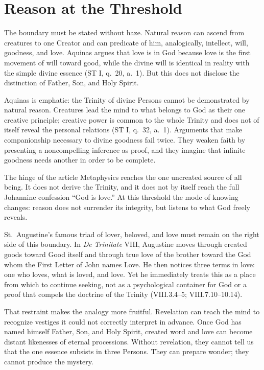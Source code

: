 \section{Reason at the Threshold}

The boundary must be stated without haze. Natural reason can ascend from creatures to one Creator and can predicate of him, analogically, intellect, will, goodness, and love. Aquinas argues that love is in God because love is the first movement of will toward good, while the divine will is identical in reality with the simple divine essence (ST I, q.~20, a.~1). But this does not disclose the distinction of Father, Son, and Holy Spirit.

Aquinas is emphatic: the Trinity of divine Persons cannot be demonstrated by natural reason. Creatures lead the mind to what belongs to God as their one creative principle; creative power is common to the whole Trinity and does not of itself reveal the personal relations (ST I, q.~32, a.~1). Arguments that make companionship necessary to divine goodness fail twice. They weaken faith by presenting a noncompelling inference as proof, and they imagine that infinite goodness needs another in order to be complete.

\begin{studybox}{The hinge of the article}
Metaphysics reaches the one uncreated source of all being. It does not derive the Trinity, and it does not by itself reach the full Johannine confession ``God is love.'' At this threshold the mode of knowing changes: reason does not surrender its integrity, but listens to what God freely reveals.
\end{studybox}

St.~Augustine's famous triad of lover, beloved, and love must remain on the right side of this boundary. In \emph{De Trinitate} VIII, Augustine moves through created goods toward Good itself and through true love of the brother toward the God whom the First Letter of John names Love. He then notices three terms in love: one who loves, what is loved, and love. Yet he immediately treats this as a place from which to continue seeking, not as a psychological container for God or a proof that compels the doctrine of the Trinity (VIII.3.4--5; VIII.7.10--10.14).

That restraint makes the analogy more fruitful. Revelation can teach the mind to recognize vestiges it could not correctly interpret in advance. Once God has named himself Father, Son, and Holy Spirit, created word and love can become distant likenesses of eternal processions. Without revelation, they cannot tell us that the one essence subsists in three Persons. They can prepare wonder; they cannot produce the mystery.

